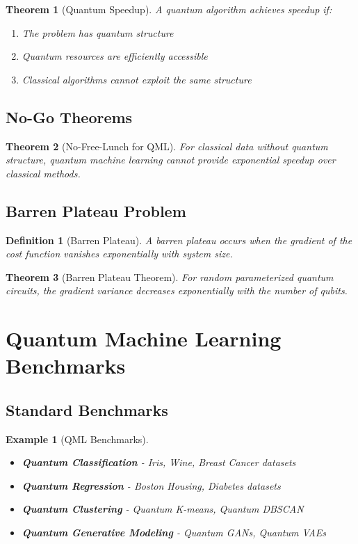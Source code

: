 \documentclass[11pt]{article}
\newtheorem{definition}{Definition}[section]
\newtheorem{theorem}{Theorem}[section]
\newtheorem{example}{Example}[section]
\begin{document}
\begin{theorem}[Quantum Speedup]
A quantum algorithm achieves speedup if:
\begin{enumerate}
    \item The problem has quantum structure
    \item Quantum resources are efficiently accessible
    \item Classical algorithms cannot exploit the same structure
\end{enumerate}
\end{theorem}

\subsection{No-Go Theorems}

\begin{theorem}[No-Free-Lunch for QML]
For classical data without quantum structure, quantum machine learning cannot provide exponential speedup over classical methods.
\end{theorem}

\subsection{Barren Plateau Problem}

\begin{definition}[Barren Plateau]
A barren plateau occurs when the gradient of the cost function vanishes exponentially with system size.
\end{definition}

\begin{theorem}[Barren Plateau Theorem]
For random parameterized quantum circuits, the gradient variance decreases exponentially with the number of qubits.
\end{theorem}

\section{Quantum Machine Learning Benchmarks}

\subsection{Standard Benchmarks}

\begin{example}[QML Benchmarks]
\begin{itemize}
    \item \textbf{Quantum Classification} - Iris, Wine, Breast Cancer datasets
    \item \textbf{Quantum Regression} - Boston Housing, Diabetes datasets
    \item \textbf{Quantum Clustering} - Quantum K-means, Quantum DBSCAN
    \item \textbf{Quantum Generative Modeling} - Quantum GANs, Quantum VAEs
\end{itemize}
\end{example}
\end{document}
